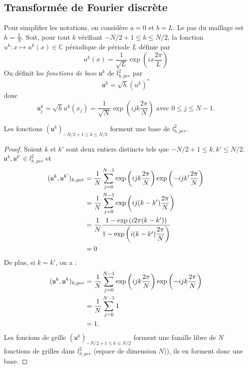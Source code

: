 \subsection{Transformée de Fourier discrète}

Pour simplifier les notations, on considère $a=0$ et $b=L$. Le pas du maillage est $h = \frac{L}{N}$.
Soit, pour tout $k$ vérifiant $-N/2+1 \leq k \leq N/2$, la fonction $u^k : x \mapsto u^k(x) \in \mathbb{C}$ périodique de période $L$ définie par 
\begin{equation}
u^k(x) = \dfrac{1}{\sqrt{L}} \exp \left( i x \dfrac{2 \pi}{L} \right)
\end{equation}
On définit les \textit{fonctions de base} $\mathfrak{u}^k$ de $l^2_{h,per}$ par
\begin{equation}
\mathfrak{u}^k = \sqrt{h} (u^k)^*
\end{equation}
donc 
\begin{equation}
\mathfrak{u}^k_j = \sqrt{h}  u^k(x_j) = \dfrac{1}{\sqrt{N}} \exp \left( i j k \dfrac{2 \pi}{N} \right) \text{ avec } 0 \leq j \leq N-1.
\label{eq:base_fourier_disc}
\end{equation}


\begin{proposition}
Les fonctions $(\mathfrak{u}^k)_{-N/2+1 \leq k \leq N/2}$ forment une base de $l^2_{h,per}$.
\end{proposition}

\begin{proof}
Soient $k$ et $k'$ sont deux entiers distincts tels que $-N/2+1 \leq k, k' \leq N/2$. $\mathfrak{u}^k, \mathfrak{u}^{k'} \in l^2_{h,per}$ et
\begin{align*}
(\mathfrak{u}^k, \mathfrak{u}^{k'})_{h,per} & = \dfrac{1}{N} \displaystyle\sum\limits_{j=0}^{N-1} \exp \left( i j k \dfrac{2 \pi}{N} \right) \exp \left( -i j k' \dfrac{2 \pi}{N} \right) \\
		& = \dfrac{1}{N} \displaystyle\sum\limits_{j=0}^{N-1} \exp \left( i j (k-k') \dfrac{2 \pi}{N} \right)\\
		& = \dfrac{1}{N} \dfrac{1 - \exp \left( i 2 \pi (k-k') \right)}{1 - \exp \left( i (k-k') \dfrac{2 \pi}{N}  \right)} \\
		& = 0
\end{align*}
De plus, si $k=k'$, on a :
\begin{align*}
(\mathfrak{u}^k, \mathfrak{u}^{k})_{h,per} & = \dfrac{1}{N} \displaystyle\sum\limits_{j=0}^{N-1} \exp \left( i j k \dfrac{2 \pi}{N} \right) \exp \left( -i j k \dfrac{2 \pi}{N} \right) \\
		& = \dfrac{1}{N} \displaystyle\sum\limits_{j=0}^{N-1} 1 \\
		& = 1.
\end{align*}
Les foncions de grille $(\mathfrak{u}^k)_{-N/2+1 \leq k \leq N/2}$ forment une famille libre de $N$ fonctions de grilles dans $l^2_{h,per}$ (espace de dimension $N$)), ils en forment donc une base.
\end{proof}

